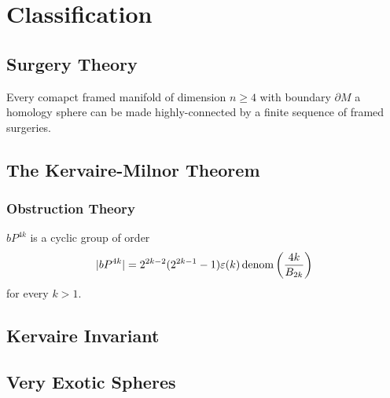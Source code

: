\chapter{Classification}\label{chap:classification}

\section{Surgery Theory}

\begin{theorem}
  Every comapct framed manifold of dimension $n\geq 4$ with boundary $\partial M$ a homology sphere can be made highly-connected by a finite sequence of framed surgeries.
\end{theorem}

\section{The Kervaire-Milnor Theorem}

\subsection{Obstruction Theory}\label{sec:obstruction-theory}

\begin{theorem}
	$bP^{4k}$ is a cyclic group of order
	\[
	  |bP^{4k}| =2^{2k-2}(2^{2k-1}-1)\varepsilon(k)\operatorname{denom}\left(\frac{4k}{B_{2k}}\right)
	\]
	for every $k>1$.
\end{theorem}

\section{Kervaire Invariant}

\section{Very Exotic Spheres}
